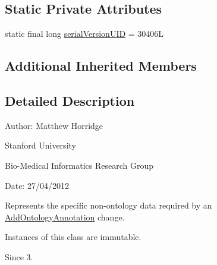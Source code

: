 \subsection*{Static Private Attributes}
\begin{DoxyCompactItemize}
\item 
static final long \hyperlink{classorg_1_1semanticweb_1_1owlapi_1_1change_1_1_add_ontology_annotation_data_aa3495efe6b3d2854b4918f73f8b242e7}{serial\-Version\-U\-I\-D} = 30406\-L
\end{DoxyCompactItemize}
\subsection*{Additional Inherited Members}


\subsection{Detailed Description}
Author\-: Matthew Horridge\par
 Stanford University\par
 Bio-\/\-Medical Informatics Research Group\par
 Date\-: 27/04/2012 

Represents the specific non-\/ontology data required by an \hyperlink{}{Add\-Ontology\-Annotation} change. 

Instances of this class are immutable. 

\begin{DoxySince}{Since}
3. 
\end{DoxySince}


